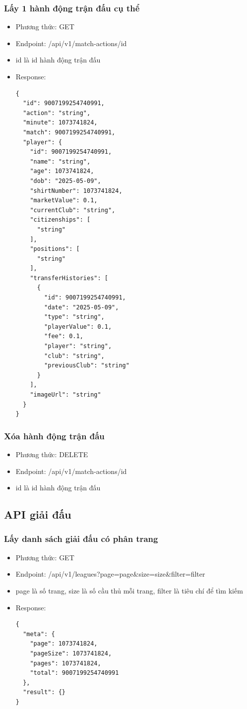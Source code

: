 \documentclass[../BTL.tex]{subfiles}
\begin{document}
\subsubsection{ Lấy 1 hành động trận đấu cụ thể}
\begin{itemize}
    \item Phương thức: GET
    \item Endpoint: /api/v1/match-actions/{id}
    \item {id} là id hành động trận đấu
    \item Response:
        \begin{verbatim}
{
  "id": 9007199254740991,
  "action": "string",
  "minute": 1073741824,
  "match": 9007199254740991,
  "player": {
    "id": 9007199254740991,
    "name": "string",
    "age": 1073741824,
    "dob": "2025-05-09",
    "shirtNumber": 1073741824,
    "marketValue": 0.1,
    "currentClub": "string",
    "citizenships": [
      "string"
    ],
    "positions": [
      "string"
    ],
    "transferHistories": [
      {
        "id": 9007199254740991,
        "date": "2025-05-09",
        "type": "string",
        "playerValue": 0.1,
        "fee": 0.1,
        "player": "string",
        "club": "string",
        "previousClub": "string"
      }
    ],
    "imageUrl": "string"
  }
}
        \end{verbatim}
\end{itemize}

\subsubsection{ Xóa hành động trận đấu}
\begin{itemize}
    \item Phương thức: DELETE
    \item Endpoint: /api/v1/match-actions/{id}
    \item {id} là id hành động trận đấu
\end{itemize}

\subsection{ API giải đấu}
\subsubsection{ Lấy danh sách giải đấu có phân trang}
\begin{itemize}
    \item Phương thức: GET
    \item Endpoint: /api/v1/leagues?page={page}\&size={size}\&filter={filter}
    \item {page} là số trang, {size} là số cầu thủ mỗi trang, {filter} là tiêu chí để tìm kiếm
    \item Response:
        \begin{verbatim}
{
  "meta": {
    "page": 1073741824,
    "pageSize": 1073741824,
    "pages": 1073741824,
    "total": 9007199254740991
  },
  "result": {}
}
        \end{verbatim}
\end{itemize}
\end{document}
